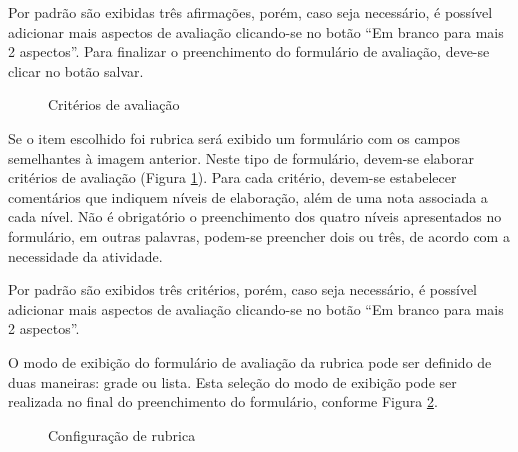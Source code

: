 Por padrão são exibidas três afirmações, porém, caso seja necessário, é possível adicionar mais aspectos de avaliação clicando-se no botão “Em branco para mais 2 aspectos”. Para finalizar o preenchimento do formulário de avaliação, deve-se clicar no botão salvar.

\begin{figure}[htbp]
 \begin{center}
  \caption{Critérios de avaliação}
  \label{fig:criterios_ava}
 \end{center}
\end{figure}

Se o item escolhido foi rubrica será exibido um formulário com os campos semelhantes à imagem anterior. Neste tipo de formulário, devem-se elaborar critérios de avaliação (Figura \ref{fig:criterios_ava}). Para cada critério, devem-se estabelecer comentários que indiquem níveis de elaboração, além de uma nota associada a cada nível. Não é obrigatório o preenchimento dos quatro níveis apresentados no formulário, em outras palavras, podem-se preencher dois ou três, de acordo com a necessidade da atividade.

Por padrão são exibidos três critérios, porém, caso seja necessário, é possível adicionar mais aspectos de avaliação clicando-se no botão “Em branco para mais 2 aspectos”.

O modo de exibição do formulário de avaliação da rubrica pode ser definido de duas maneiras: grade ou lista. Esta seleção do modo de exibição pode ser realizada no final do preenchimento do formulário, conforme Figura \ref{fig:config_rubrica}.

\begin{figure}[htbp]
 \begin{center}
  \caption{Configuração de rubrica}
  \label{fig:config_rubrica}
 \end{center}
\end{figure}

